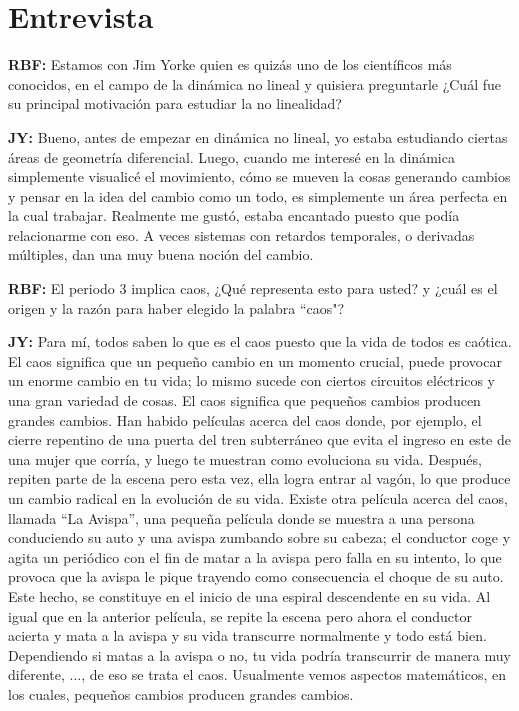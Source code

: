 \documentclass{rbf}
\newcommand{\mr}{{\bf RBF: }}
\newcommand{\jim}{{\bf JY: }}
\begin{document}
\section{Entrevista}\label{inter}
\mr Estamos con Jim Yorke quien es quizás uno de los científicos más conocidos, en el campo de la dinámica no lineal y quisiera preguntarle ¿Cuál fue su principal motivación para estudiar la no linealidad?

\jim Bueno, antes de empezar en dinámica no lineal, yo estaba estudiando ciertas áreas de geometría diferencial. Luego, cuando me interesé en la dinámica simplemente visualicé el movimiento, cómo se mueven la cosas generando cambios y pensar en la idea del cambio como un todo, es simplemente un área perfecta en la cual trabajar. Realmente me gustó, estaba encantado puesto que podía relacionarme con eso. A veces sistemas con retardos temporales, o derivadas múltiples, dan una muy buena noción del cambio.

\mr El periodo 3 implica caos, ¿Qué representa esto para usted? y ¿cuál es el origen y la razón para haber elegido la palabra ``caos"?

\jim Para mí, todos saben lo que es el caos puesto que la vida de todos es caótica. El caos significa que un pequeño cambio en un momento crucial, puede provocar un enorme cambio en tu vida; lo mismo sucede con ciertos circuitos eléctricos y una gran variedad de cosas. El caos significa que pequeños cambios producen grandes cambios. Han habido películas acerca del caos donde, por ejemplo, el cierre repentino de una puerta del tren subterráneo que evita el ingreso en este de una mujer que corría, y luego te muestran como evoluciona su vida. Después, repiten parte de la escena pero esta vez, ella logra entrar al vagón, lo que produce un cambio radical en la evolución de su vida. Existe otra película acerca del caos, llamada ``La Avispa'', una pequeña película donde se muestra a una persona conduciendo su auto y una avispa zumbando sobre su cabeza; el conductor coge y agita un periódico con el fin de matar a la avispa pero falla en su intento, lo que provoca que la avispa le pique trayendo como consecuencia el choque de su auto. Este hecho, se constituye en el inicio de una espiral descendente en su vida. Al igual que en la anterior película, se repite la escena pero ahora el conductor acierta y mata a la avispa y su vida transcurre normalmente y todo está bien. Dependiendo si matas a la avispa o no,
tu vida podría transcurrir de manera muy diferente, ..., de eso se trata el caos. Usualmente vemos aspectos matemáticos, en los cuales, pequeños cambios producen grandes cambios.
\end{document}
